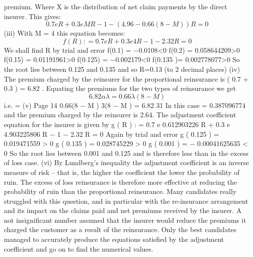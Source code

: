 \documentclass[a4paper,12pt]{article}
\begin{document}
premium.
Where X is the distribution of net claim payments by the direct insurer. This
gives:
\[0.7 e R + 0.3 e MR − 1 − ( 4.96 − 0.66 ( 8 − M ) ) R = 0\]
(iii)
With M = 4 this equation becomes:
\[f ( R ) : = 0.7 e R + 0.3 e 4 R − 1 − 2.32 R = 0\]
We shall find R by trial and error
f(0.1) = −0.0108<0
f(0.2) = 0.058644209>0
f(0.15) = 0.01191961>0
f(0.125) = −0.002179<0
f(0.135 )= 0.002778077>0
So the root lies between 0.125 and 0.135 and so R=0.13 (to 2 decimal places)
(iv)
The premium charged by the reinsurer for the proportional reinsurance is
\lambda  \times  \alpha  {} \times  ( 0.7 + 0.3  ) = 6.82 \alpha \lambda  .
Equating the premiums for the two types of reinsurance we get
\[6.82 \alpha \lambda  = 0.66 \lambda  (8 − M )\]
i.e.
\alpha =
(v)
Page 14
0.66(8 − M ) 3(8 − M )
=
6.82
31
In this case \alpha  = 0.387096774 and the premium charged by the reinsurer is
2.64\lambda  .%
The adjustment coefficient equation for the insurer is given by
g ( R ) : = 0.7 e 0.612903226 R + 0.3 e 4.903225806 R − 1 − 2.32 R = 0
Again by trial and error
g ( 0.125 ) = 0.019471559 > 0
g ( 0.135 ) = 0.028745229 > 0
g ( 0.001 ) = − 0.00041625635 < 0
So the root lies between 0.001 and 0.125 and is therefore less than in the
excess of loss case.
(vi)
By Lundberg’s inequality the adjustment coefficient is an inverse measure of risk – that is, the higher the coefficient the lower the probability of ruin. The
excess of loss reinsurance is therefore more effective at reducing the probability of ruin than the proportional reinsurance.
Many candidates really struggled with this question, and in particular with the re-insurance arrangement and its impact on the claims paid and net premiums received by the insurer. A
not insignificant number assumed that the insurer would reduce the premiums it charged the customer as a result of the reinsurance. Only the best candidates managed to accurately
produce the equations satisfied by the adjustment coefficient and go on to find the numerical values.
\end{document}
